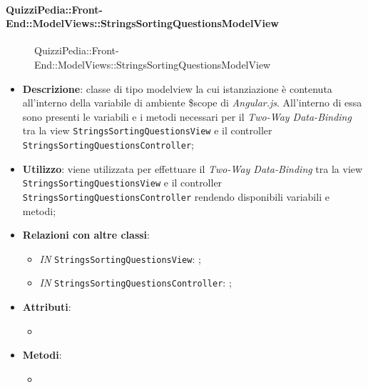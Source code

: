 \paragraph{QuizziPedia::Front-End::ModelViews::StringsSortingQuestionsModelView}
\begin{figure} [ht]
	\centering
	\caption{QuizziPedia::Front-End::ModelViews::StringsSortingQuestionsModelView}
\end{figure} \FloatBarrier
\begin{itemize}
	\item \textbf{Descrizione}: classe di tipo modelview la cui istanziazione è contenuta all'interno della variabile di ambiente \$scope di \textit{Angular.js}. All'interno di essa sono presenti le variabili e i metodi necessari per il \textit{Two-Way Data-Binding} tra la view \texttt{StringsSortingQuestionsView} e il controller \texttt{StringsSortingQuestionsController}; 
	\item \textbf{Utilizzo}: viene utilizzata per effettuare il \textit{Two-Way Data-Binding} tra la view \texttt{StringsSortingQuestionsView} e il controller \texttt{StringsSortingQuestionsController} rendendo disponibili variabili e metodi;
	\item \textbf{Relazioni con altre classi}:
	\begin{itemize}
		\item \textit{IN} \texttt{StringsSortingQuestionsView}: ; 
		\item \textit{IN} \texttt{StringsSortingQuestionsController}: ;
	\end{itemize}
	\item \textbf{Attributi}:
	\begin{itemize}
		\item
	\end{itemize}
	\item \textbf{Metodi}:
	\begin{itemize}
		\item 
	\end{itemize}
\end{itemize}

